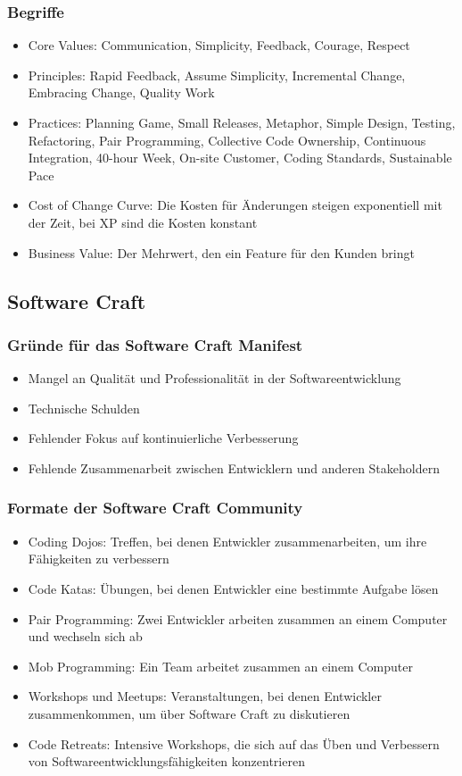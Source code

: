 \subsubsection{Begriffe}
\begin{itemize}
    \item Core Values: Communication, Simplicity, Feedback, Courage, Respect
    \item Principles: Rapid Feedback, Assume Simplicity, Incremental Change, Embracing Change, Quality Work
    \item Practices: Planning Game, Small Releases, Metaphor, Simple Design, Testing, Refactoring, Pair Programming, Collective Code Ownership, Continuous Integration, 40-hour Week, On-site Customer, Coding Standards, Sustainable Pace
    \item Cost of Change Curve: Die Kosten für Änderungen steigen exponentiell mit der Zeit, bei XP sind die Kosten konstant
    \item Business Value: Der Mehrwert, den ein Feature für den Kunden bringt
\end{itemize}

\subsection{Software Craft}
\subsubsection{Gründe für das Software Craft Manifest}
\begin{itemize}
    \item Mangel an Qualität und Professionalität in der Softwareentwicklung
    \item Technische Schulden
    \item Fehlender Fokus auf kontinuierliche Verbesserung
    \item Fehlende Zusammenarbeit zwischen Entwicklern und anderen Stakeholdern
\end{itemize}

\subsubsection{Formate der Software Craft Community}
\begin{itemize}
    \item Coding Dojos: Treffen, bei denen Entwickler zusammenarbeiten, um ihre Fähigkeiten zu verbessern
    \item Code Katas: Übungen, bei denen Entwickler eine bestimmte Aufgabe lösen
    \item Pair Programming: Zwei Entwickler arbeiten zusammen an einem Computer und wechseln sich ab
    \item Mob Programming: Ein Team arbeitet zusammen an einem Computer
    \item Workshops und Meetups: Veranstaltungen, bei denen Entwickler zusammenkommen, um über Software Craft zu diskutieren
    \item Code Retreats: Intensive Workshops, die sich auf das Üben und Verbessern von Softwareentwicklungsfähigkeiten konzentrieren
\end{itemize}

